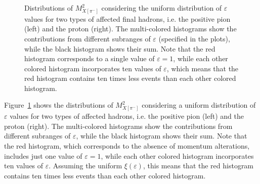 \begin{figure}[htp]
\begin{center}
\caption{\small Distributions of $M_{X[\pi^{-}]}^{2}$ considering the uniform distribution of $\varepsilon$ values for two types of affected final hadrons, i.e. the positive pion (left) and the proton (right). The multi-colored histograms show the contributions from different subranges of $\varepsilon$ (specified in the plots), while the black histogram shows their sum. Note that the red histogram corresponds to a single value of $\varepsilon = 1$, while each other colored histogram incorporates ten values of $\varepsilon$, which means that the red histogram contains ten times less events than each other colored histogram.} \label{fig:mm_fsi_detail}
\end{center}
\end{figure}
\newpage

Figure~\ref{fig:mm_fsi_detail} shows the distributions of $M_{X[\pi^{-}]}^{2}$ considering a uniform distribution of $\varepsilon$ values for two types of affected hadrons, i.e. the positive pion (left) and the proton (right). The multi-colored histograms show the contributions from different subranges of $\varepsilon$, while the black histogram shows their sum. Note that the red histogram, which corresponds to the absence of momentum alterations, includes just one value of $\varepsilon = 1$, while each other colored histogram incorporates ten values of $\varepsilon$. Assuming the uniform $\xi(\varepsilon)$, this means that the red histogram contains ten times less events than each other colored histogram. 


